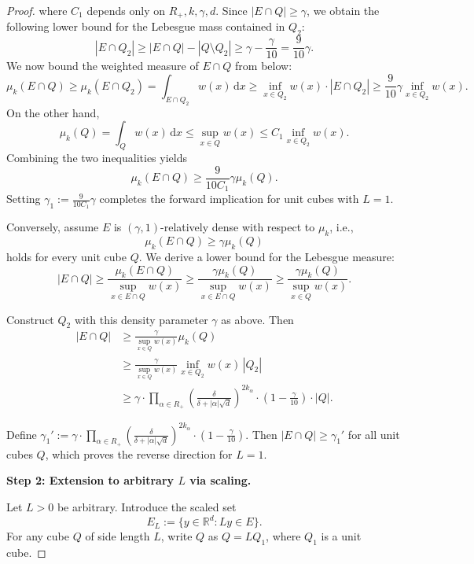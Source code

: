 \documentclass[12pt]{article}
\begin{document}
\begin{proof}
where $C_1$ depends only on $R_+, k, \gamma, d$. Since $|E\cap Q| \ge \gamma$, we obtain the following lower bound for the Lebesgue mass contained in $Q_2$:
\[
|E\cap Q_2| \ge |E\cap Q| - |Q\setminus Q_2| \ge \gamma - \frac{\gamma}{10} = \frac{9}{10}\gamma.
\]
We now bound the weighted measure of $E\cap Q$ from below:
\[
\mu_k(E\cap Q) \ge \mu_k(E\cap Q_2)
= \int_{E\cap Q_2} w(x)\,\mathrm{d}x
\ge \inf_{x\in Q_2} w(x) \cdot |E\cap Q_2|
\ge \frac{9}{10}\gamma \inf_{x\in Q_2} w(x).
\]
On the other hand,
\[
\mu_k(Q) = \int_Q w(x)\,\mathrm{d}x \le \sup_{x\in Q} w(x) \le C_1 \inf_{x\in Q_2} w(x).
\]
Combining the two inequalities yields
\[
\mu_k(E\cap Q) \ge \frac{9}{10C_1}\gamma \mu_k(Q).
\]
Setting $\gamma_1 := \frac{9}{10C_1}\gamma$ completes the forward implication for unit cubes with $L=1$.

Conversely, assume $E$ is $(\gamma,1)$-relatively dense with respect to $\mu_k$, i.e.,
\[
\mu_k(E\cap Q) \ge \gamma \mu_k(Q)
\]
holds for every unit cube $Q$. We derive a lower bound for the Lebesgue measure:
\[
|E\cap Q| \ge \frac{\mu_k(E\cap Q)}{\sup_{x\in E\cap Q} w(x)}
\ge \frac{\gamma \mu_k(Q)}{\sup_{x\in E\cap Q} w(x)}
\ge \frac{\gamma \mu_k(Q)}{\sup_{x\in   Q} w(x)}.
\]

Construct $Q_2$ with this density parameter $\gamma$ as above. Then
\begin{align*}
|E\cap Q| &\ge \frac{\gamma}{\sup_{x\in Q} w(x)} \mu_k(Q) \\
&\ge \frac{\gamma}{\sup_{x\in Q} w(x)} \inf_{x\in Q_2} w(x) \, |Q_2| \\
&\ge \gamma \cdot \prod_{\alpha\in R_+} \left( \frac{\delta}{\delta+|\alpha|\sqrt{d}} \right)^{2k_\alpha} \cdot \left(1-\frac{\gamma}{10}\right) \cdot |Q|.
\end{align*}

Define $\gamma_1' := \gamma \cdot \prod_{\alpha\in R_+} \left( \frac{\delta}{\delta+|\alpha|\sqrt{d}} \right)^{2k_\alpha} \cdot \left(1-\frac{\gamma}{10}\right)$. Then $|E\cap Q|\ge \gamma_1'$ for all unit cubes $Q$, which proves the reverse direction for $L=1$.

\medskip
\noindent\textbf{Step 2: Extension to arbitrary $L$ via scaling.}

Let $L>0$ be arbitrary. Introduce the scaled set
\[
E_L := \{ y \in \mathbb{R}^d : L y \in E \}.
\]
For any cube $Q$ of side length $L$, write $Q$ as $Q = L Q_1$, where $Q_1$ is a unit cube.


\end{proof}
\end{document}
